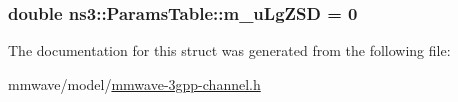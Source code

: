 \subsubsection[{\texorpdfstring{m\+\_\+u\+Lg\+Z\+SD}{m_uLgZSD}}]{\setlength{\rightskip}{0pt plus 5cm}double ns3\+::\+Params\+Table\+::m\+\_\+u\+Lg\+Z\+SD = 0}\hypertarget{structns3_1_1ParamsTable_aae35745f216dbbd1ea226b542ab0d944}{}\label{structns3_1_1ParamsTable_aae35745f216dbbd1ea226b542ab0d944}


The documentation for this struct was generated from the following file\+:\begin{DoxyCompactItemize}
\item 
mmwave/model/\hyperlink{mmwave-3gpp-channel_8h}{mmwave-\/3gpp-\/channel.\+h}\end{DoxyCompactItemize}
